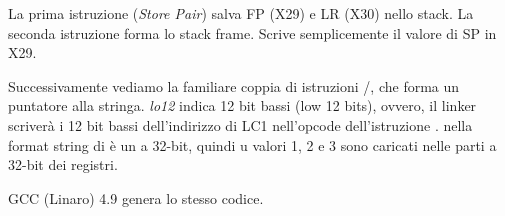 





La prima istruzione  (\emph{Store Pair}) salva \ac{FP} (X29) e \ac{LR} (X30) nello stack.
La seconda istruzione  forma lo stack frame.
Scrive semplicemente il valore di \ac{SP} in X29.

Successivamente vediamo la familiare coppia di istruzioni /\ADD , che forma un puntatore alla stringa.
\emph{lo12} indica 12 bit bassi (low 12 bits), ovvero, il linker scriverà i 12 bit bassi dell'indirizzo di LC1 nell'opcode dell'istruzione \ADD .
 nella format string di \printf è un \Tint a 32-bit, quindi u valori 1, 2 e 3 sono caricati nelle parti a 32-bit dei registri.

\Optimizing GCC (Linaro) 4.9 genera lo stesso codice.
